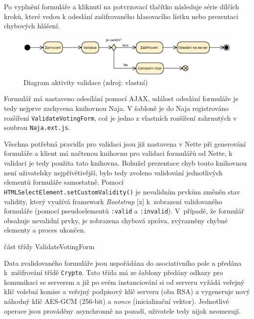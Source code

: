 Po vyplnění formuláře a kliknutí na potvrzovací tlačítko následuje série dílčích kroků, které vedou k odeslání zašifrovaného hlasovacího lístku nebo prezentaci chybových hlášení.

\begin{figure}[h]
	\centering
	\includegraphics[width=\linewidth]{svg/validace.eps}
	\captionsetup{width=\linewidth}
	\caption[Diagram aktivity validace]{Diagram aktivity validace (zdroj: vlastní)}
	\label{fig:diagramValidace}
\end{figure}

Formulář má nastaveno odesílání pomocí AJAX, událost odeslání formuláře je tedy nejprve zachycena knihovnou Naja. V šabloně je do Naja registrováno rozšíření \texttt{ValidateVotingForm}, což je jedno z vlastních rozšíření zahrnutých v soubrou \texttt{Naja.ext.js}.

Všechna potřebná pravidla pro validaci jsou již nastavena v Nette při generování formuláře a klient má načtenou knihovnu pro validaci formulářů od Nette, k validaci je tedy použita tato knihovna. Bohužel prezentace chyb touto knihovnou není uživatelsky nejpřívětivější, bylo tedy zvoleno validování jednotlivých elementů formuláře samostatně. Pomocí \texttt{HTMLSelectElement.setCustomValidity()} je nevalidním prvkům změněn stav validity, který využívá framework \textit{Bootstrap} [x] k~zobrazení validovaného formuláře (pomocí pseudoelementů \texttt{:valid} a \texttt{:invalid}). V~případě, že formulář obsahuje nevalidní prvky, je zobrazena chybová zpráva, zvýrazněny chybné elementy a proces ukončen.

\begin{listing}[ht]
\caption{část třídy ValidateVotingForm}
\label{php:validace}
\end{listing}

Data zvalidovaného formuláře jsou uspořádána do asociativního pole a předána k~zašifrování třídě \texttt{Crypto}. Tato třída má ze šablony předány odkazy pro komunikaci se serverem a již po svém instanciování si od serveru vyžádá veřejný klíč volební komise a veřejný podpisový klíč serveru (oba RSA) a vygeneruje nový náhodný klíč AES-GCM (256-bit) a \textit{nonce} (inicializační vektor). Jednotlivé operace jsou prováděny asynchronně na pozadí, uživatele tedy nijak neomezují.

